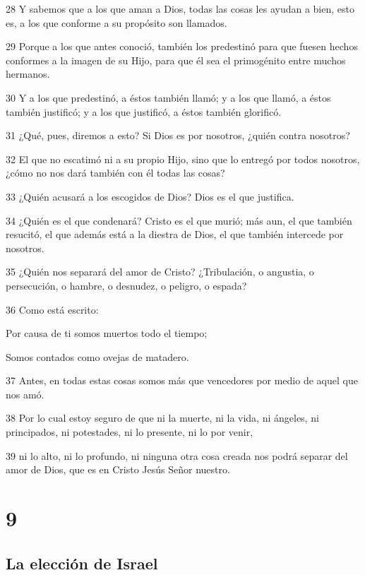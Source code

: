 \par 28 Y sabemos que a los que aman a Dios, todas las cosas les ayudan a bien, esto es, a los que conforme a su propósito son llamados.
\par 29 Porque a los que antes conoció, también los predestinó para que fuesen hechos conformes a la imagen de su Hijo, para que él sea el primogénito entre muchos hermanos.
\par 30 Y a los que predestinó, a éstos también llamó; y a los que llamó, a éstos también justificó; y a los que justificó, a éstos también glorificó.
\par 31 ¿Qué, pues, diremos a esto? Si Dios es por nosotros, ¿quién contra nosotros?
\par 32 El que no escatimó ni a su propio Hijo, sino que lo entregó por todos nosotros, ¿cómo no nos dará también con él todas las cosas?
\par 33 ¿Quién acusará a los escogidos de Dios? Dios es el que justifica.
\par 34 ¿Quién es el que condenará? Cristo es el que murió; más aun, el que también resucitó, el que además está a la diestra de Dios, el que también intercede por nosotros.
\par 35 ¿Quién nos separará del amor de Cristo? ¿Tribulación, o angustia, o persecución, o hambre, o desnudez, o peligro, o espada?
\par 36 Como está escrito:
\par Por causa de ti somos muertos todo el tiempo;
\par Somos contados como ovejas de matadero.
\par 37 Antes, en todas estas cosas somos más que vencedores por medio de aquel que nos amó.
\par 38 Por lo cual estoy seguro de que ni la muerte, ni la vida, ni ángeles, ni principados, ni potestades, ni lo presente, ni lo por venir,
\par 39 ni lo alto, ni lo profundo, ni ninguna otra cosa creada nos podrá separar del amor de Dios, que es en Cristo Jesús Señor nuestro.

\chapter{9}

\section*{La elección de Israel}

